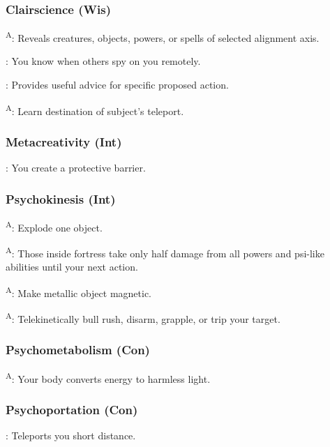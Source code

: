 \subsubsection{Clairscience (Wis)}

\textsuperscript{A}: Reveals creatures, objects, powers, or spells of selected alignment axis.

: You know when others spy on you remotely.

: Provides useful advice for specific proposed action.

\textsuperscript{A}: Learn destination of subject's teleport.


\subsubsection{Metacreativity (Int)}

: You create a protective barrier.


\subsubsection{Psychokinesis (Int)}

\textsuperscript{A}: Explode one object.

\textsuperscript{A}: Those inside fortress take only half damage from all powers and psi-like abilities until your next action.

\textsuperscript{A}: Make metallic object magnetic.

\textsuperscript{A}: Telekinetically bull rush, disarm, grapple, or trip your target.


\subsubsection{Psychometabolism (Con)}

\textsuperscript{A}: Your body converts energy to harmless light.


\subsubsection{Psychoportation (Con)}

: Teleports you short distance.

